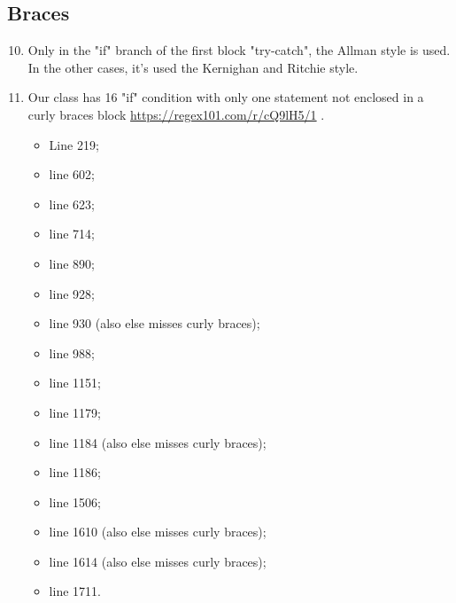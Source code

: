 \subsection{Braces}
\begin{enumerate}
	\setcounter{enumi}{9}
	\item Only in the "if" branch of the first block "try-catch", the Allman style is used. In the other cases, it's used the Kernighan and Ritchie style.
	\item Our class has 16 "if" condition with only one statement not enclosed in a curly braces block \url{https://regex101.com/r/cQ9lH5/1} .
	\begin{itemize}
		\item Line 219;
		\item line 602;
		\item line 623;
		\item line 714;
		\item line 890;
		\item line 928;
		\item line 930 (also else misses curly braces);
		\item line 988;
		\item line 1151;
		\item line 1179;
		\item line 1184 (also else misses curly braces);
		\item line 1186;
		\item line 1506;
		\item line 1610 (also else misses curly braces);
		\item line 1614 (also else misses curly braces);
		\item line 1711.
	\end{itemize}
\end{enumerate}
